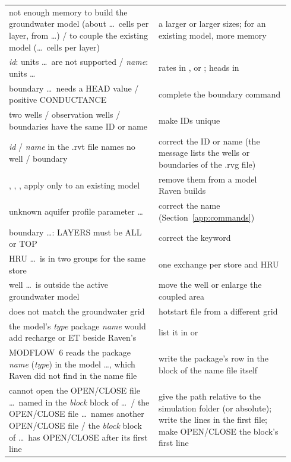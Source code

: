 \begin{longtable}{P{0.5\linewidth}P{0.44\linewidth}}
not enough memory to build the groundwater model (about \dots\ cells per layer, from \dots) / to couple the existing model (\dots\ cells per layer) & a larger  or larger  sizes; for an existing model, more memory\\
 \emph{id}: units \dots\ are not supported /  \emph{name}: units \dots & rates in ,  or ; heads in \\
boundary \dots\ needs a HEAD value / positive CONDUCTANCE & complete the boundary command\\
two wells / observation wells / boundaries have the same ID or name & make IDs unique\\
 \emph{id} /  \emph{name} in the .rvt file names no well / boundary & correct the ID or name (the message lists the wells or boundaries of the .rvg file)\\
, , ,  apply only to an existing model & remove them from a model Raven builds\\
unknown aquifer profile parameter \dots & correct the  name (Section~\ref{app:commands})\\
boundary \dots: LAYERS must be ALL or TOP & correct the keyword\\
HRU \dots\ is in two  groups for the same store & one exchange per store and HRU\\
well \dots\ is outside the active groundwater model & move the well or enlarge the coupled area\\
 does not match the groundwater grid & hotstart file from a different grid\\
the model's \emph{type} package \emph{name} would add recharge or ET beside Raven's & list it in  or \\
MODFLOW~6 reads the package \emph{name} (\emph{type}) in the model \dots, which Raven did not find in the name file & write the package's row in the  block of the name file itself\\
cannot open the OPEN/CLOSE file \dots\ named in the \emph{block} block of \dots\ / the OPEN/CLOSE file \dots\ names another OPEN/CLOSE file / the \emph{block} block of \dots\ has OPEN/CLOSE after its first line & give the path relative to the simulation folder (or absolute); write the lines in the first file; make OPEN/CLOSE the block's first line\\

\end{longtable}
